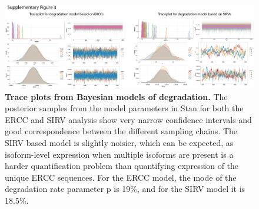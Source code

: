 \begin{figure}
    \centering
    \includegraphics[width=\textwidth]{"Supp Figure 3"}
    \caption[Trace plots from Bayesian models of degradation]{\textbf{Trace plots from Bayesian models of degradation.} The posterior samples from the model parameters in Stan \cite{Carpenter2016-pa} for both the ERCC and SIRV analysis show very narrow confidence intervals and good correspondence between the different sampling chains. The SIRV based model is slightly noisier, which can be expected, as isoform-level expression when multiple isoforms are present is a harder quantification problem than quantifying expression of the unique ERCC sequences. For the ERCC model, the mode of the degradation rate parameter p is 19\%, and for the SIRV model it is 18.5\%.}
    \label{fig:traceplot}
\end{figure}
